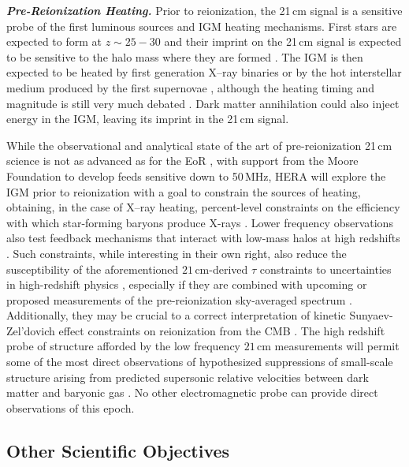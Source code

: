 \documentclass[preprint,11pt]{aastex}
\begin{document}
\emph{\textbf{Pre-Reionization Heating.}}
\label{sec:EoX} 
Prior to reionization, the 21\,cm signal is a sensitive probe of the first
luminous sources and IGM heating mechanisms. First stars are expected to form
at $z \sim 25-30$ and their imprint on the 21\,cm signal is expected to be
sensitive to the halo mass where they are formed \citep{mesinger_et_al2015}.
The IGM is then expected to be heated by first
generation X--ray binaries
\citep{furlanetto_et_al2006_global,pritchard_et_al2007,mesinger_et_al2013} or
by the hot interstellar medium produced by the first supernovae
\citep{pacucci_et_al2014}, although the heating timing and magnitude is still
very much debated \citep{fialkov_et_al2012}. Dark matter annihilation
\citep{evoli_et_al2014} could also inject energy in the IGM, leaving its
imprint in the 21\,cm signal.
 
While the observational and analytical state of the art of pre-reionization 21\,cm science is not as advanced as for the EoR \citep{ewall-wice_et_al2016-EoXLimits}, with support from the Moore Foundation to develop feeds sensitive down to 50\,MHz, HERA will explore the IGM prior to
reionization with a goal to constrain the sources of heating, obtaining, in the case of
X--ray heating, percent-level constraints on the efficiency with which star-forming baryons
produce X-rays \citep{ewall-wice_et_al2015}. Lower
frequency observations also test feedback
mechanisms that interact with low-mass halos at high redshifts
\citep{Iliev_et_al2007,Iliev_et_al2012,ahn_et_al2012}.
Such constraints, while interesting in their own right, also reduce
the susceptibility of the aforementioned $21\,\textrm{cm}$-derived $\tau$
constraints to uncertainties in high-redshift physics \citep{liu_et_al2015}, especially if they are 
combined with upcoming or proposed measurements of 
the pre-reionization sky-averaged spectrum \citep{fialkov_and_loeb2016}. Additionally, they may be crucial to a correct
interpretation of kinetic Sunyaev-Zel'dovich effect constraints on reionization
from the CMB \citep{park_et_al2013}. The high redshift probe of
structure afforded by the low frequency $21\,\textrm{cm}$ measurements will
permit some of the most direct observations of hypothesized suppressions of
small-scale structure
\citep{dalal_et_al2010,tseliakhovich_et_al2011,fialkov_et_al2012} arising from
predicted supersonic relative velocities between dark matter and baryonic gas
\citep{tseliakhovich_and_hirata2010}. No other electromagnetic probe can provide direct observations of this
epoch. 


\subsection{Other Scientific Objectives}
\label{subsec:broader_science}
\end{document}
